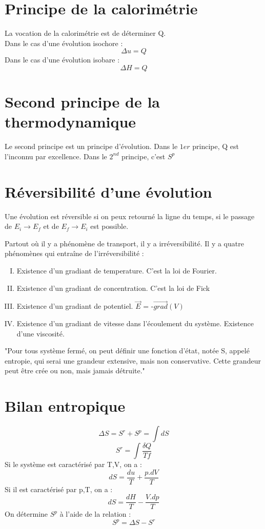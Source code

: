 \section{Principe de la calorimétrie}
La vocation de la calorimétrie est de déterminer Q.\\
Dans le cas d'une évolution isochore :
$$\Delta u = Q$$
Dans le cas d'une évolution isobare :
$$\Delta H = Q$$

\section{Second principe de la thermodynamique}
Le second principe est un principe d'évolution. Dans le $1{er}$ principe, Q est l'inconnu par excellence. Dans le $2^{nd}$ principe, c'est $S^{p}$
\section{Réversibilité d'une évolution}
\begin{de}
 Une évolution est réversible si on peux retourné la ligne du temps, si le passage de $E_i \rightarrow E_f$ et de $E_f \rightarrow E_i$ est possible.
\end{de}
Partout où il y a phénomène de transport, il y a irréversibilité. Il y a quatre phénomènes qui entraîne de l'irréversibilité : 
\begin{enumerate}[I) ]
 \item Existence d'un gradiant de temperature. C'est la loi de Fourier.
 \item Existence d'un gradiant de concentration. C'est la loi de Fick
 \item Existence d'un gradiant de potentiel. $\overrightarrow{E}$ = -$\overrightarrow{grad}(V)$
 \item Existence d'un gradiant de vitesse dans l'écoulement du système. Existence d'une viscosité.
\end{enumerate}
\begin{theo}
 "Pour tous système fermé, on peut définir une fonction d'état, notée S, appelé entropie, qui serai une grandeur extensive, mais non conservative. Cette grandeur peut être crée ou non, mais jamais détruite."
\end{theo}
\section{Bilan entropique}
$$\Delta S = S^{r}+S^{p}=\int dS$$
$$S^{r}=\int \dfrac{\delta Q}{Tf}$$
Si le système est caractérisé par T,V, on a :
$$dS = \dfrac{du}{T}+\dfrac{p.dV}{T}$$
Si il est caractérisé par p,T, on a :
$$dS = \dfrac{dH}{T}-\dfrac{V.dp}{T}$$
On détermine $S^{p}$ à l'aide de la relation :
$$S^{p} = \Delta S - S^{r}$$
